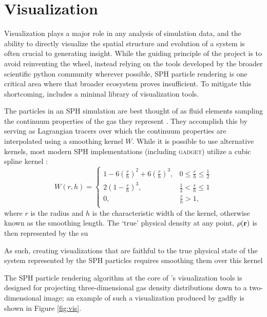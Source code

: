\section{Visualization}
\label{sec:vis}
Visualization plays a major role in any analysis of simulation data, and the ability to directly visualize the spatial structure and evolution of a system is often crucial to generating insight.
While the guiding principle of the  project is to avoid reinventing the wheel, instead relying on the tools developed by the broader scientific python community wherever possible, SPH particle rendering is one critical area where that broader ecosystem proves insufficient.  
To mitigate this shortcoming,  includes a minimal library of visualization tools.

The particles in an SPH simulation are best thought of as fluid elements sampling the continuum properties of the gas they represent \citep{Lucy1977,GingoldMonaghan1977,Monaghan1992,Springel2010}.  They accomplish this by serving as Lagrangian tracers over which the continuum properties are interpolated using a smoothing kernel $W$. While it is possible to use alternative kernels, most modern SPH implementations (including \textsc{gadget}) utilize a cubic spline kernel \citep{Springel2014}: 
\begin{equation}
W(r,h) =
     \begin{cases}
       1 - 6 \left( \frac{r}{h} \right)^2 + 6 \left( \frac{r}{h} \right)^3, & 0 \leq \frac{r}{h} \leq \frac{1}{2}\\
       2 \left(1 - \frac{r}{h}\right)^3, & \frac{1}{2} < \frac{r}{h} \leq 1\\
       0, & \frac{r}{h} >  1,\\
     \end{cases}
\end{equation}
where $r$ is the radius and $h$ is the characteristic width of the kernel, otherwise known as the smoothing length.  The `true' physical density at any point, $\rho(\bf{r})$ is then represented by the su

As such, creating visualizations that are faithful to the true physical state of the system represented by the SPH particles requires smoothing them over this kernel

The SPH particle rendering algorithm at the core of 's visualization tools is designed for projecting three-dimensional gas density distributions down to a two-dimensional image; an example of such a visualization produced by gadfly is shown in Figure \ref{fig:vis}.

